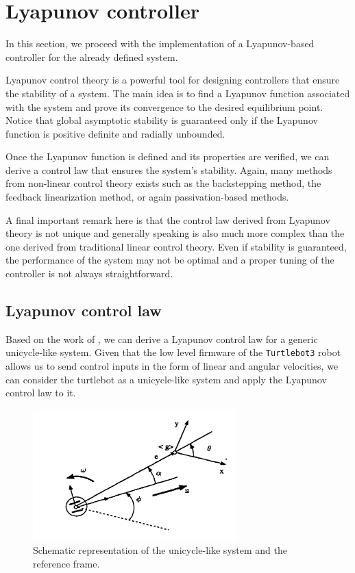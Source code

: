 \section{Lyapunov controller}
\label{sec:lyapunov_controller}

In this section, we proceed with the implementation of a Lyapunov-based controller for the already defined system.

Lyapunov control theory is a powerful tool for designing controllers that ensure the stability of a system.
The main idea is to find a Lyapunov function associated with the system and prove its convergence to the desired equilibrium point.
Notice that global asymptotic stability is guaranteed only if the Lyapunov function is positive definite and radially unbounded.

Once the Lyapunov function is defined and its properties are verified, we can derive a control law that ensures the system's stability.
Again, many methods from non-linear control theory exists such as the backstepping method, the feedback linearization method, or again passivation-based methods.

A final important remark here is that the control law derived from Lyapunov theory is not unique and generally speaking is also much more complex than the one derived from traditional linear control theory.
Even if stability is guaranteed, the performance of the system may not be optimal and a proper tuning of the controller is not always straightforward.


\subsection{Lyapunov control law}
\label{subsec:lyapunov_control_law}

Based on the work of \cite{lyapunov_techniques}, we can derive a Lyapunov control law for a generic unicycle-like system.
Given that the low level firmware of the \texttt{Turtlebot3} robot allows us to send control inputs in the form of linear and angular velocities, we can consider the turtlebot as a unicycle-like system and apply the Lyapunov control law to it.

\begin{figure}[H]
    \centering
    \includegraphics[width=0.7\textwidth]{./img/lyapunov_scheme.png}
    \caption{Schematic representation of the unicycle-like system and the reference frame.}
    \label{fig:lyapunov_scheme}
\end{figure}

